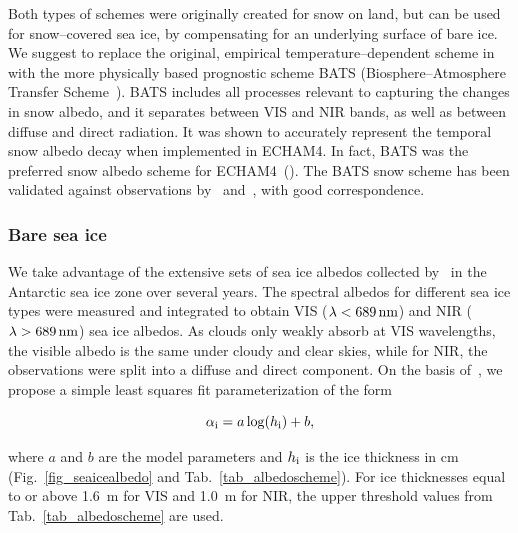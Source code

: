 Both types of schemes were originally created for snow on land, but
can be used for snow--covered sea ice, by compensating for an
underlying surface of bare ice. We suggest to replace the original,
empirical temperature--dependent scheme in \echam{} with the more
physically based prognostic scheme BATS (Biosphere--Atmosphere
Transfer Scheme~\cite{dickinson1986}). BATS includes all processes relevant
to capturing the changes in snow albedo, and it separates between VIS
and NIR bands, as well as between diffuse and direct radiation. It was
shown to accurately represent the temporal snow albedo decay when
implemented in ECHAM4. In fact, BATS was the preferred snow albedo
scheme for ECHAM4~(\cite{roesch2000}). The BATS snow scheme has been
validated against observations by~\cite{roesch2000} and~\cite{yang1997}, with
good correspondence.

\subsubsection{Bare sea ice}
We take advantage of the extensive sets of sea ice albedos collected
by~\cite{brandt2005} in the Antarctic sea ice zone over several years. The
spectral albedos for different sea ice types were measured and
integrated to obtain VIS ($\lambda<689\,{\rm nm}$) and NIR
($\lambda>689\,{\rm nm}$)
sea ice albedos. As clouds only weakly absorb at VIS wavelengths, the
visible albedo is the same under cloudy and clear skies, while for
NIR, the observations were split into a diffuse and direct
component. On the basis of~\cite{brandt2005}, we propose a simple least
squares fit parameterization of the form

\begin{equation}
\alpha_{\rm i}= a \log(h_{\rm i}) + b,
\end{equation}

where $a$ and $b$ are the model parameters and $h_{\rm i}$ is the ice
thickness in cm (Fig.~\ref{fig_seaicealbedo} and
Tab.~\ref{tab_albedoscheme}). For ice thicknesses equal to or above
1.6~m for VIS and 1.0~m for NIR, the upper threshold values from
Tab.~\ref{tab_albedoscheme} are used.

